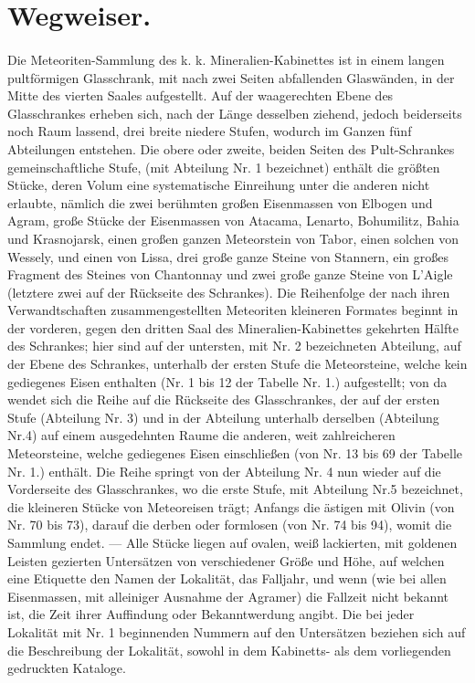\documentclass[a4paper, 11pt, oneside, polutonikogreek, german]{article}
\begin{document}
\section{Wegweiser.}
\paragraph{}
Die Meteoriten-Sammlung des k. k. Mineralien-Kabinettes ist in einem langen pultförmigen Glasschrank, mit nach zwei Seiten abfallenden Glaswänden, in der Mitte des vierten Saales aufgestellt. Auf der waagerechten Ebene des Glasschrankes erheben sich, nach der Länge desselben ziehend, jedoch beiderseits noch Raum lassend, drei breite niedere Stufen, wodurch im Ganzen fünf Abteilungen entstehen. Die obere oder zweite, beiden Seiten des Pult-Schrankes gemeinschaftliche Stufe, (mit Abteilung Nr. 1 bezeichnet) enthält die größten Stücke, deren Volum eine systematische Einreihung unter die anderen nicht erlaubte, nämlich die zwei berühmten großen Eisenmassen von Elbogen und Agram, große Stücke der Eisenmassen von Atacama, Lenarto, Bohumilitz, Bahia und Krasnojarsk, einen großen ganzen Meteorstein von Tabor, einen solchen von Wessely, und einen von Lissa, drei große ganze Steine von Stannern, ein großes Fragment des Steines von Chantonnay und zwei große ganze Steine von L’Aigle (letztere zwei auf der Rückseite des Schrankes). Die Reihenfolge der nach ihren Verwandtschaften zusammengestellten Meteoriten kleineren Formates beginnt in der vorderen, gegen den dritten Saal des Mineralien-Kabinettes gekehrten Hälfte des Schrankes; hier sind auf der untersten, mit Nr. 2 bezeichneten Abteilung, auf der Ebene des Schrankes, unterhalb der ersten Stufe die Meteorsteine, welche kein gediegenes Eisen enthalten (Nr. 1 bis 12 der Tabelle Nr. 1.) aufgestellt; von da wendet sich die Reihe auf die Rückseite des Glasschrankes, der auf der ersten Stufe (Abteilung Nr. 3) und in der Abteilung unterhalb derselben (Abteilung Nr.4) auf einem ausgedehnten Raume die anderen, weit zahlreicheren Meteorsteine, welche gediegenes Eisen einschließen (von Nr. 13 bis 69 der Tabelle Nr. 1.) enthält. Die Reihe springt von der Abteilung Nr. 4 nun wieder auf die Vorderseite des Glasschrankes, wo die erste Stufe, mit Abteilung Nr.5 bezeichnet, die kleineren Stücke von Meteoreisen trägt; Anfangs die ästigen mit Olivin (von Nr. 70 bis 73), darauf die derben oder formlosen (von Nr. 74 bis 94), womit die Sammlung endet. — Alle Stücke liegen auf ovalen, weiß lackierten, mit goldenen Leisten gezierten Untersätzen von verschiedener Größe und Höhe, auf welchen eine Etiquette den Namen der Lokalität, das Falljahr, und wenn (wie bei allen Eisenmassen, mit alleiniger Ausnahme der Agramer) die Fallzeit nicht bekannt ist, die Zeit ihrer Auffindung oder Bekanntwerdung angibt. Die bei jeder Lokalität mit Nr. 1 beginnenden Nummern auf den Untersätzen beziehen sich auf die Beschreibung der Lokalität, sowohl in dem Kabinetts- als dem vorliegenden gedruckten Kataloge.
\clearpage
\end{document}
